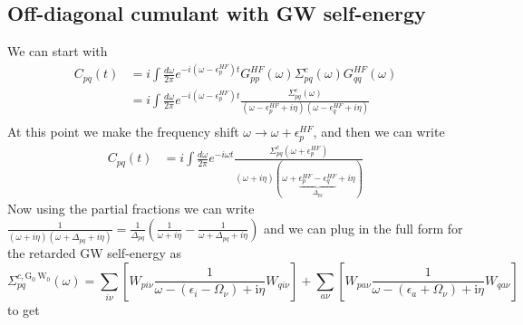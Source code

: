 \subsection{Off-diagonal cumulant with GW self-energy}
We can start with
\begin{align}
		C_{pq}(t) &= i \int \frac{d\omega}{2\pi} e^{-i(\omega-\epsilon_p^{HF})t} G_{pp}^{HF}(\omega) \Sigma_{pq}^c(\omega) G_{qq}^{HF}(\omega) \\
&= i \int \frac{d\omega}{2\pi} e^{-i(\omega-\epsilon_p^{HF})t} \frac{\Sigma_{pq}^c(\omega)}{(\omega - \epsilon_p^{HF} + i\eta)(\omega - \epsilon_q^{HF} + i\eta)} 
\label{eq:Cpp_m1}\\
\end{align}
At this point we make the frequency shift $\omega \to \omega + \epsilon_p^{HF}$, and then we can write
\begin{align}
    C_{pq}(t) &= i \int \frac{d\omega}{2\pi} e^{-i\omega t} \frac{\Sigma_{pq}^c(\omega + \epsilon_p^{HF})}{(\omega + i\eta)(\omega + \underbrace{\epsilon_p^{HF} - \epsilon_q^{HF}}_{\Delta_{pq}} + i\eta)}
\end{align}
Now using the partial fractions we can write $\frac{1}{(\omega + i\eta)(\omega + \Delta_{pq} + i\eta)} = \frac{1}{\Delta_{pq}}\left(\frac{1}{\omega + i\eta} - \frac{1}{\omega + \Delta_{pq} + i\eta}\right)$ and we can plug in the full form for the retarded GW self-energy as 
\begin{equation}
    \Sigma_{pq}^{c, \mathrm{G}_0 \mathrm{~W}_0}(\omega)= \sum_{i \nu}\left[W_{p i \nu} \frac{1}{\omega-\left(\epsilon_i-\Omega_\nu\right)+\mathrm{i} \eta} W_{q i \nu}\right]+ \sum_{a \nu}\left[W_{p a \nu} \frac{1}{\omega-\left(\epsilon_a+\Omega_\nu\right)+\mathrm{i} \eta} W_{q a \nu}\right]
\end{equation}
to get
